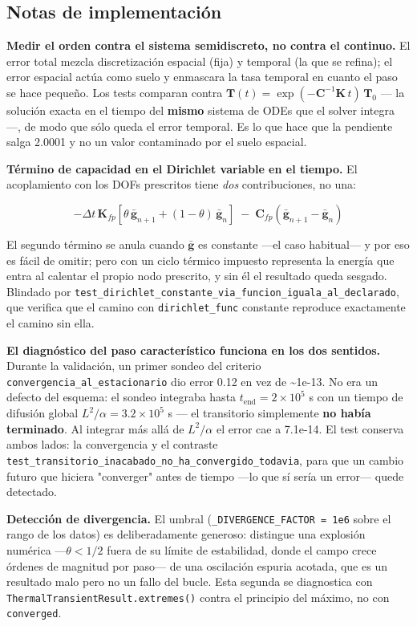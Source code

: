 \documentclass[11pt,letterpaper,oneside]{report}
\begin{document}
\subsection{Notas de implementación}

\textbf{Medir el orden contra el sistema semidiscreto, no contra el continuo.} El error total mezcla discretización espacial (fija) y temporal (la que se refina); el error espacial actúa como suelo y enmascara la tasa temporal en cuanto el paso se hace pequeño. Los tests comparan contra $\mathbf T(t) = \exp(-\mathbf C^{-1}\mathbf K\, t)\,\mathbf T_0$ --- la solución exacta en el tiempo del \textbf{mismo} sistema de ODEs que el solver integra ---, de modo que sólo queda el error temporal. Es lo que hace que la pendiente salga 2.0001 y no un valor contaminado por el suelo espacial.

\textbf{Término de capacidad en el Dirichlet variable en el tiempo.} El acoplamiento con los DOFs prescritos tiene \textit{dos} contribuciones, no una:

\[
-\Delta t\,\mathbf K_{fp}\left[\theta\,\bar{\mathbf g}_{n+1} + (1-\theta)\,\bar{\mathbf g}_n\right] \;-\; \mathbf C_{fp}\left(\bar{\mathbf g}_{n+1} - \bar{\mathbf g}_n\right)
\]

El segundo término se anula cuando $\bar{\mathbf g}$ es constante ---el caso habitual--- y por eso es fácil de omitir; pero con un ciclo térmico impuesto representa la energía que entra al calentar el propio nodo prescrito, y sin él el resultado queda sesgado. Blindado por \texttt{test\_dirichlet\_constante\_via\_funcion\_iguala\_al\_declarado}, que verifica que el camino con \texttt{dirichlet\_func} constante reproduce exactamente el camino sin ella.

\textbf{El diagnóstico del paso característico funciona en los dos sentidos.} Durante la validación, un primer sondeo del criterio \texttt{convergencia\_al\_estacionario} dio error 0.12 en vez de \textasciitilde{}1e-13. No era un defecto del esquema: el sondeo integraba hasta $t_\text{end} = 2 \times 10^5$ s con un tiempo de difusión global $L^2/\alpha = 3.2 \times 10^5$ s --- el transitorio simplemente \textbf{no había terminado}. Al integrar más allá de $L^2/\alpha$ el error cae a 7.1e-14. El test conserva ambos lados: la convergencia y el contraste \texttt{test\_transitorio\_inacabado\_no\_ha\_convergido\_todavia}, para que un cambio futuro que hiciera "converger" antes de tiempo ---lo que sí sería un error--- quede detectado.

\textbf{Detección de divergencia.} El umbral (\texttt{\_DIVERGENCE\_FACTOR = 1e6} sobre el rango de los datos) es deliberadamente generoso: distingue una explosión numérica ---$\theta < 1/2$ fuera de su límite de estabilidad, donde el campo crece órdenes de magnitud por paso--- de una oscilación espuria acotada, que es un resultado malo pero no un fallo del bucle. Esta segunda se diagnostica con \texttt{ThermalTransientResult.extremes()} contra el principio del máximo, no con \texttt{converged}.
\end{document}
